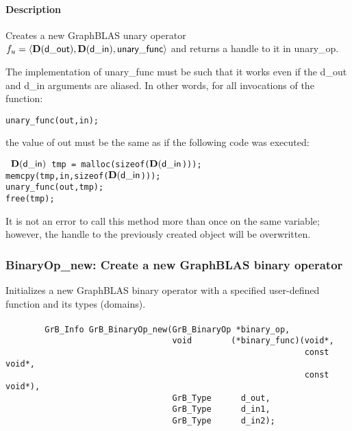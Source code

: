 \paragraph{Description}

\newenvironment{code}{\tt}{}

Creates a new GraphBLAS unary operator $f_u = \langle \mathbf{D}({\sf d\_out}), 
\mathbf{D}({\sf d\_in}), {\sf unary\_func} \rangle$ and returns a handle to it 
in {\sf unary\_op}.

The implementation of {\sf unary\_func} must be such that it works
even if the {\sf d\_out} and {\sf d\_in} arguments are aliased.
In other words, for all invocations of the function:
\begin{verbatim}
unary_func(out,in);
\end{verbatim}
the value of {\sf out} must be the same as if the following code
was executed:

\begin{code}
    $\mathbf{D}({\sf d\_in})$ tmp = malloc(sizeof($\mathbf{D}({\sf d\_in}$))); \\
    memcpy(tmp,in,sizeof($\mathbf{D}({\sf d\_in}$))); \\
    unary\_func(out,tmp); \\
    free(tmp);
\end{code}

It is not an error to call this method more than once on the same variable;  
however, the handle to the previously created object will be overwritten. 


\subsubsection{{\sf BinaryOp\_new}: Create a new GraphBLAS binary operator}

Initializes a new GraphBLAS binary operator with a specified user-defined 
function and its types (domains).

\paragraph{\syntax}

\begin{verbatim}
        GrB_Info GrB_BinaryOp_new(GrB_BinaryOp *binary_op,
                                  void        (*binary_func)(void*,
                                                             const void*,
                                                             const void*),
                                  GrB_Type      d_out,
                                  GrB_Type      d_in1,
                                  GrB_Type      d_in2);
\end{verbatim}


